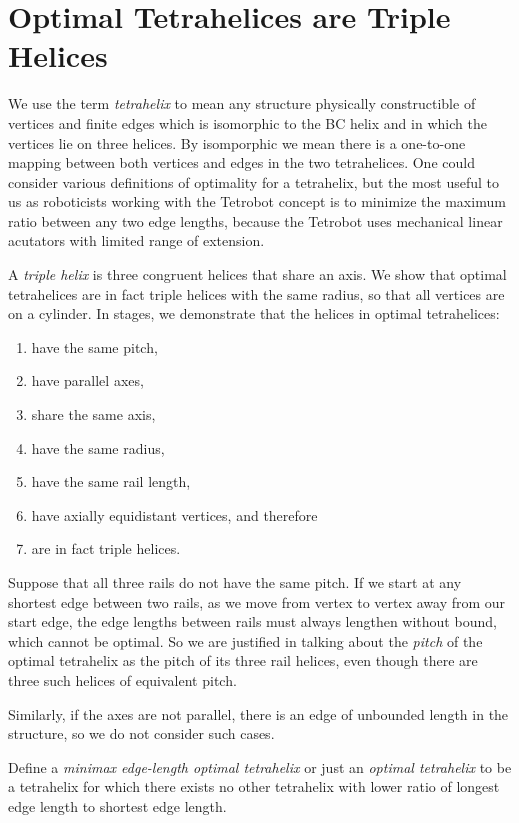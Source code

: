 \documentclass[twocolumn,10pt]{asme2ej}
\begin{document}
\section{Optimal Tetrahelices are Triple Helices}

We use the term \emph{tetrahelix} to mean any structure physically constructible of
vertices and finite edges which is isomorphic to the BC helix and in which the
vertices lie on three helices.
By isomporphic we mean there is a one-to-one mapping between both
vertices and edges in the two tetrahelices.
One could consider various definitions of optimality for a
tetrahelix, but the most useful to us as roboticists working with the Tetrobot
concept is to minimize the
maximum ratio between any two edge lengths, because the Tetrobot uses
mechanical linear acutators with
limited range of extension.

A \emph{triple helix} is three congruent helices that share an axis. We show that
optimal tetrahelices are in fact triple helices with the same radius, so that all
vertices are on a cylinder. In stages, we demonstrate that the helices in optimal tetrahelices:
\begin{enumerate}
\item have the same pitch,
\item have parallel axes,
\item share the same axis,
\item have the same radius,
  \item have the same rail length,
  \item have axially equidistant vertices, and therefore
  \item are in fact triple helices.
\end{enumerate}

Suppose that all three rails do not have the same pitch. If we start at any shortest edge between
two rails, as we move
from vertex to vertex away from our start edge, the edge lengths
between rails must always lengthen without bound,
which cannot be optimal.
So we are justified in talking about the
\emph{pitch} of 
the optimal tetrahelix as the pitch of its three rail helices, even though there are
three such helices of equivalent pitch.

Similarly, if the axes are not parallel, there is an edge of
unbounded length in the structure, so we do not consider such cases.

Define a \emph{minimax edge-length optimal tetrahelix} or just an
\emph{optimal tetrahelix} to be a tetrahelix for which there exists
no other tetrahelix with lower ratio of longest edge length to shortest edge length.
\end{document}
